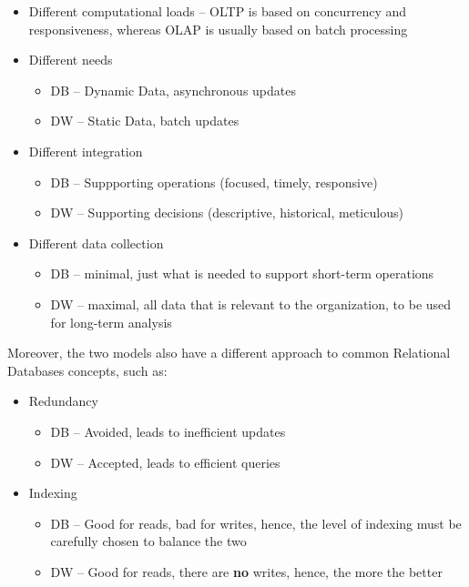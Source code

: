\documentclass[openright, twoside, twocolumn]{report}
\begin{document}
\begin{itemize}
  \item Different computational loads -- OLTP is based on concurrency and responsiveness, whereas OLAP
  is usually based on batch processing
  \item Different needs
  \begin{itemize}
    \item DB -- Dynamic Data, asynchronous updates
    \item DW -- Static Data, batch updates
  \end{itemize}
  \item Different integration
  \begin{itemize}
    \item DB -- Suppporting operations  (focused, timely, responsive)
    \item DW -- Supporting decisions (descriptive, historical, meticulous)
  \end{itemize}
  \item Different data collection
  \begin{itemize}
    \item DB -- minimal, just what is needed to support short-term operations
    \item DW -- maximal, all data that is relevant to the organization, to be
    used for long-term analysis
  \end{itemize}
\end{itemize}

Moreover, the two models also have a different approach to common Relational Databases
concepts, such as:

\begin{itemize}
  \item Redundancy
  \begin{itemize}
    \item DB -- Avoided, leads to inefficient updates
    \item DW -- Accepted, leads to efficient queries
  \end{itemize}
  \item Indexing
  \begin{itemize}
    \item DB -- Good for reads, bad for writes, hence, the level of indexing
    must be carefully chosen to balance the two
    \item DW -- Good for reads, there are \textbf{no} writes, hence, the more the better
  \end{itemize}
\end{itemize}
\end{document}
